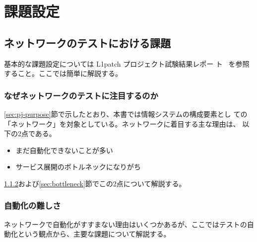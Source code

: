 
\chapter{課題設定}
\label{chap:problem-setting}

 \section{ネットワークのテストにおける課題}
 \label{sec:nw-test-problem}


基本的な課題設定については L1patch プロジェクト試験結果レポー
ト~\cite{l1pjpoc} を参照すること。ここでは簡単に解説する。

  \subsection{なぜネットワークのテストに注目するのか}
  \label{sec:reason-to-focus-network}

\ref{sec:pj-purpose}節で示したとおり、本書では情報システムの構成要素とし
ての「ネットワーク」を対象としている。ネットワークに着目する主な理由は、
以下の2点である。
\begin{itemize}
 \item まだ自動化できないことが多い
 \item サービス展開のボトルネックになりがち
\end{itemize}
\ref{sec:difficulty}および\ref{sec:bottleneck}節でこの2点について解説する。

  \subsection{自動化の難しさ}
  \label{sec:difficulty}

ネットワークで自動化がすすまない理由はいくつかあるが、ここではテストの自
動化という観点から、主要な課題について解説する。

